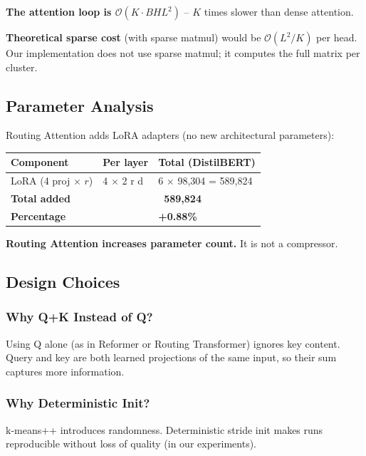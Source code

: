 \textbf{The attention loop is $\mathcal{O}(K \cdot BHL^2)$} -- $K$ times slower 
than dense attention.

\textbf{Theoretical sparse cost} (with sparse matmul) would be $\mathcal{O}(L^2/K)$ 
per head. Our implementation does not use sparse matmul; it computes the 
full matrix per cluster.

\subsection{Parameter Analysis}

Routing Attention adds LoRA adapters (no new architectural parameters):

\begin{table}[H]
\centering
\small
\begin{tabular}{lll}
\toprule
\textbf{Component} & \textbf{Per layer} & \textbf{Total (DistilBERT)} \\
\midrule
LoRA (4 proj $\times$ $r$) & 4 $\times$ 2 r d & 6 $\times$ 98,304 = 589,824 \\
\textbf{Total added} &  & \textbf{~589,824} \\
\textbf{Percentage} &  & \textbf{+0.88\%} \\
\bottomrule
\end{tabular}
\end{table}

\textbf{Routing Attention increases parameter count.} It is not a compressor.

\subsection{Design Choices}

\subsubsection{Why Q+K Instead of Q?}

Using Q alone (as in Reformer or Routing Transformer) ignores key content. 
Query and key are both learned projections of the same input, so their sum 
captures more information.

\subsubsection{Why Deterministic Init?}

k-means++ introduces randomness. Deterministic stride init makes runs 
reproducible without loss of quality (in our experiments).

